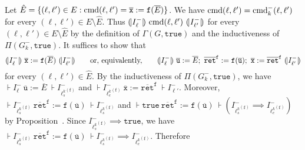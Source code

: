 Let $\hat{E} = \{ (\ell, \ell') \in E : \textmd{cmd} (\ell, \ell') =
\overline{\mathtt{x}} := \mathtt{f} (\overline{E}) \}$. We have
$\textmd{cmd} (\ell, \ell') = \textmd{cmd}^-_k (\ell, \ell')$ for every
$(\ell, \ell') \in E \setminus \hat{E}$. Thus $(\!| {I^-_{\ell}} |\!)\
\textmd{cmd} (\ell, \ell')\ (\!| {I^-_{\ell'}} |\!)$ for every $(\ell,
\ell') \in E \setminus \hat{E}$ by the definition of $\Gamma (G,
\mathtt{true})$ and the inductiveness of $\Pi (G^-_k,
\mathtt{true})$. It suffices to show that
\begin{equation*}
  \assert{I^-_{\ell}}\
  \overline{\mathtt{x}} := \mathtt{f} (\overline{E})
  \ \assert{I^-_{\ell'}}
  \hspace{2em}
  \textmd{or, equivalently,}
  \hspace{2em}
  \assert{I^-_{\ell}}\ 
  \overline{\mathtt{u}} := \overline{E};\ 
  \mathtt{\overline{ret}^{\mathtt{f}}} := \mathtt{f} (\overline{\mathtt{u}});\ 
  \overline{\mathtt{x}} := \mathtt{\overline{ret}^{\mathtt{f}}}
  \ \assert{I^-_{\ell'}}
\end{equation*}
for every $(\ell, \ell') \in \hat{E}$. 
By the inductiveness of $\Pi (G^-_k, \mathtt{true})$, we have
$\assert{I^-_{\ell}}\ \overline{\mathtt{u}} := \overline{E}\
\assert{I^-_{{\ell^k_s}^{(\mathtt{f})}}}$ and
$\assert{I^-_{{\ell^k_e}^{\mathtt{(f)}}}}\ \overline{\mathtt{x}} :=
\mathtt{\overline{ret}^{\mathtt{f}}}\ \assert{I^-_{\ell'}}$. Moreover,
$\assert{I^-_{{\ell^k_s}^{(\mathtt{f})}}}\
\mathtt{\overline{ret}^{\mathtt{f}}} := \mathtt{f}
(\overline{\mathtt{u}})\ \assert{I^-_{{\ell^k_s}^{(\mathtt{f})}}}$ and
$\assert{\mathtt{true}}\ \mathtt{\overline{ret}^f} := \mathtt{f}
(\overline{\mathtt{u}})\ \assert{(I^-_{{\ell^k_s}^{(\mathtt{f})}} \implies
  I^-_{{\ell^k_e}^{(\mathtt{f})}})}$ by Proposition~\todo{what?}.
Since $I^-_{{\ell^k_s}^{(\mathtt{f})}} \implies \mathtt{true}$, we have
$\assert{I^-_{{\ell^k_s}^{(\mathtt{f})}}}\
\mathtt{\overline{ret}^{\mathtt{f}}} := \mathtt{f}
(\overline{\mathtt{u}})\  \assert{I^-_{{\ell^k_s}^{(\mathtt{f})}}
  \implies I^-_{{\ell^k_e}^{(\mathtt{f})}}}$. Therefore
